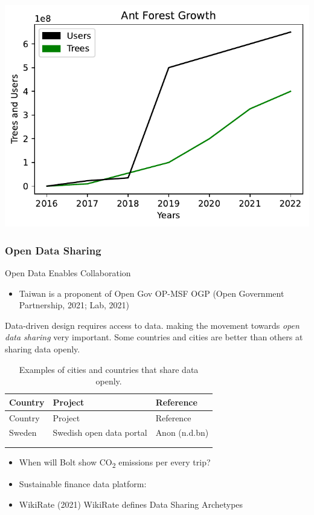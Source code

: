 \documentclass[
  letterpaper,
  DIV=11,
  numbers=noendperiod]{scrartcl}
\providecommand{\tightlist}{%
  \setlength{\itemsep}{0pt}\setlength{\parskip}{0pt}}\usepackage{longtable,booktabs,array}
\begin{document}
\includegraphics{_thesis_files/figure-pdf/cell-22-output-1.pdf}

\subsubsection{Open Data Sharing}\label{open-data-sharing}

Open Data Enables Collaboration

\begin{itemize}
\tightlist
\item
  Taiwan is a proponent of Open Gov OP-MSF OGP (Open Government
  Partnership, 2021; Lab, 2021)
\end{itemize}

Data-driven design requires access to data. making the movement towards
\emph{open data sharing} very important. Some countries and cities are
better than others at sharing data openly.

\begin{longtable}[]{@{}lll@{}}
\caption{Examples of cities and countries that share data
openly.}\tabularnewline
\toprule\noalign{}
Country & Project & Reference \\
\midrule\noalign{}
\endfirsthead
\toprule\noalign{}
Country & Project & Reference \\
\midrule\noalign{}
\endhead
\bottomrule\noalign{}
\endlastfoot
Sweden & Swedish open data portal & Anon (n.d.bn) \\
& & \\
& & \\
\end{longtable}

\begin{itemize}
\tightlist
\item
  When will Bolt show CO\textsubscript{2} emissions per every trip?
\item
  Sustainable finance data platform:
\item
  WikiRate (2021) WikiRate defines Data Sharing Archetypes
\end{itemize}
\end{document}
